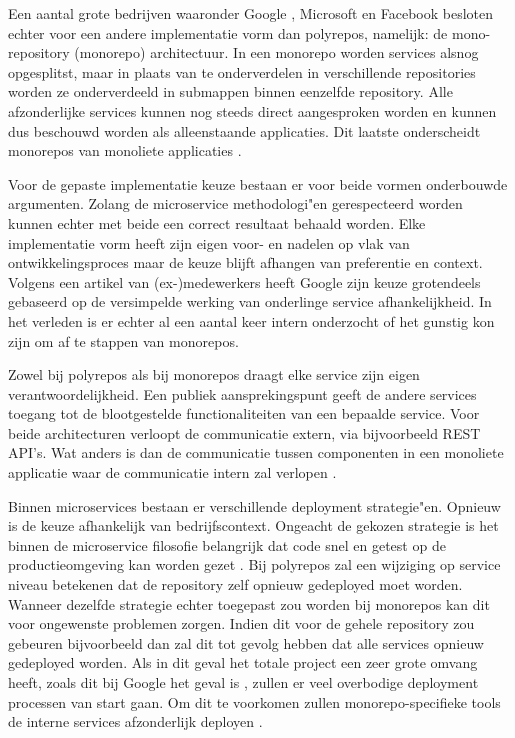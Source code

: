 \documentclass{hogent-article}
\begin{document}
Een aantal grote bedrijven waaronder Google \autocite{Potvin&Levenberg2016}, Microsoft \autocite{Tirion2021} en Facebook \autocite{Goode2014} besloten echter voor een andere implementatie vorm dan polyrepos, namelijk: de mono-repository (monorepo) architectuur.
In een monorepo worden services alsnog opgesplitst, maar in plaats van te onderverdelen in verschillende repositories worden ze onderverdeeld in submappen binnen eenzelfde repository.
Alle afzonderlijke services kunnen nog steeds direct aangesproken worden en kunnen dus beschouwd worden als alleenstaande applicaties.
Dit laatste onderscheidt monorepos van monoliete applicaties \autocite{Brito2018}.

Voor de gepaste implementatie keuze bestaan er voor beide vormen onderbouwde argumenten. Zolang de microservice methodologi"en gerespecteerd worden kunnen echter met beide een correct resultaat behaald worden. Elke implementatie vorm heeft zijn eigen voor- en nadelen op vlak van ontwikkelingsproces maar de keuze blijft afhangen van preferentie en context. Volgens een artikel van (ex-)medewerkers \textcite{Potvin&Levenberg2016} heeft Google zijn keuze grotendeels gebaseerd op de versimpelde werking van onderlinge service afhankelijkheid. In het verleden is er echter al een aantal keer intern onderzocht of het gunstig kon zijn om af te stappen van monorepos.  

Zowel bij polyrepos als bij monorepos draagt elke service zijn eigen verantwoordelijkheid. Een publiek aansprekingspunt geeft de andere services toegang tot de blootgestelde functionaliteiten van een bepaalde service. Voor beide architecturen verloopt de communicatie extern, via bijvoorbeeld REST API's. Wat anders is dan de communicatie tussen componenten in een monoliete applicatie waar de communicatie intern zal verlopen \autocite{Richardson2019}.

Binnen microservices bestaan er verschillende deployment strategie"en. Opnieuw is de keuze afhankelijk van bedrijfscontext. Ongeacht de gekozen strategie is het binnen de microservice filosofie belangrijk dat code snel en getest op de productieomgeving kan worden gezet \autocite{Richardson2019}.
Bij polyrepos zal een wijziging op service niveau betekenen dat de repository zelf opnieuw gedeployed moet worden. Wanneer dezelfde strategie echter toegepast zou worden bij monorepos kan dit voor ongewenste problemen zorgen. Indien dit voor de gehele repository zou gebeuren bijvoorbeeld dan zal dit tot gevolg hebben dat alle services opnieuw gedeployed worden. Als in dit geval het totale project een zeer grote omvang heeft, zoals dit bij Google het geval is \autocite{Potvin&Levenberg2016}, zullen er veel overbodige deployment processen van start gaan. Om dit te voorkomen zullen monorepo-specifieke tools de interne services afzonderlijk deployen \autocite{Matei2020}. 
\end{document}
